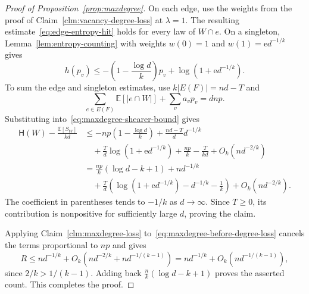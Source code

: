 \documentclass[11pt,reqno]{amsart}
\makeatletter
\numberwithin{equation}{section}
\theoremstyle{plain}
\newenvironment{claimproof}[1][Proof]{\par
    \pushQED{\qed}%
    \renewcommand{\qedsymbol}{$\blacksquare$}
    \normalfont \topsep6\p@\@plus6\p@\relax
    \trivlist
    \item[\hskip\labelsep
    \textit{#1}\@addpunct{.}~]\ignorespaces
}{%
    \popQED\endtrivlist\@endpefalse
}
\theoremstyle{definition}
\newcommand{\E}{\mathbb E}
\newcommand{\HH}{\mathsf H}
\makeatother
\begin{document}
\begin{proof}[Proof of Proposition~\ref{prop:maxdegree}]
\begin{claimproof}[Proof of Claim~\ref{clm:maxdegree-loss}]
        On each edge, use the weights from the proof of Claim~\ref{clm:vacancy-degree-loss} at $\lambda=1$.
        The resulting estimate~\eqref{eq:edge-entropy-hit} holds for every law of $W\cap e$.
        On a singleton, Lemma~\ref{lem:entropy-counting} with weights $w(0)=1$ and $w(1)=\mathrm e d^{-1/k}$ gives
        \[
            h(p_v)\le-\left(1-\frac{\log d}{k}\right)p_v+\log(1+\mathrm e d^{-1/k}).
        \]
        To sum the edge and singleton estimates, use $k|E(F)|=nd-T$ and
        \[
            \sum_{e\in E(F)}\E[|e\cap W|]+\sum_v a_vp_v=dnp.
        \]
        Substituting into~\eqref{eq:maxdegree-shearer-bound} gives
        \[
            \begin{aligned}
                \HH(W)-\frac{\E[S_W]}{kd}
                &\le-np\left(1-\frac{\log d}{k}\right)+\frac{nd-T}{d}d^{-1/k}\\
                &\quad+\frac Td\log(1+\mathrm e d^{-1/k})+\frac{np}{k}-\frac{T}{kd}+O_k(nd^{-2/k})\\
                &=\frac{np}{k}(\log d-k+1)+nd^{-1/k}\\
                &\quad+\frac Td\left(\log(1+\mathrm e d^{-1/k})-d^{-1/k}-\frac1k\right)+O_k(nd^{-2/k}).
            \end{aligned}
        \]
        The coefficient in parentheses tends to $-1/k$ as $d\to\infty$.
        Since $T\ge0$, its contribution is nonpositive for sufficiently large $d$, proving the claim.
    \end{claimproof}

    Applying Claim~\ref{clm:maxdegree-loss} to~\eqref{eq:maxdegree-before-degree-loss} cancels the terms proportional to $np$ and gives
    \[
        R\le nd^{-1/k}+O_k(nd^{-2/k}+nd^{-1/(k-1)})
        =nd^{-1/k}+O_k(nd^{-1/(k-1)}),
    \]
    since $2/k>1/(k-1)$.
    Adding back $\frac nk(\log d-k+1)$ proves the asserted count.
    This completes the proof.
\end{proof}

\end{document}
